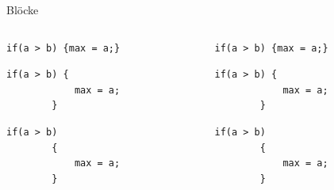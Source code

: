 \documentclass[10pt]{beamer} %
\begin{document}
\begin{frame}[fragile]{Blöcke}

	\begin{columns}
	\begin{column}{.4\textwidth}
	
	\begin{lstlisting}[gobble=4]
		if(a > b) {max = a;}
	\end{lstlisting}
	
	\begin{lstlisting}[gobble=4]
		if(a > b) {
			max = a;
		}
	\end{lstlisting}
	
	\begin{lstlisting}[gobble=4]
		if(a > b) 
		{
			max = a;
		}
	\end{lstlisting}
	
	\end{column}
	\begin{column}{.4\textwidth}
	
	\begin{lstlisting}[gobble=4,showspaces,showtabs]
		if(a > b) {max = a;}
	\end{lstlisting}
	
	\begin{lstlisting}[gobble=4,showspaces,showtabs]
		if(a > b) {
			max = a;
		}
	\end{lstlisting}
	
	\begin{lstlisting}[gobble=4,showspaces,showtabs]
		if(a > b) 
		{
			max = a;
		}
	\end{lstlisting}

	\end{column}
	\end{columns}
	
\end{frame}
\end{document}
